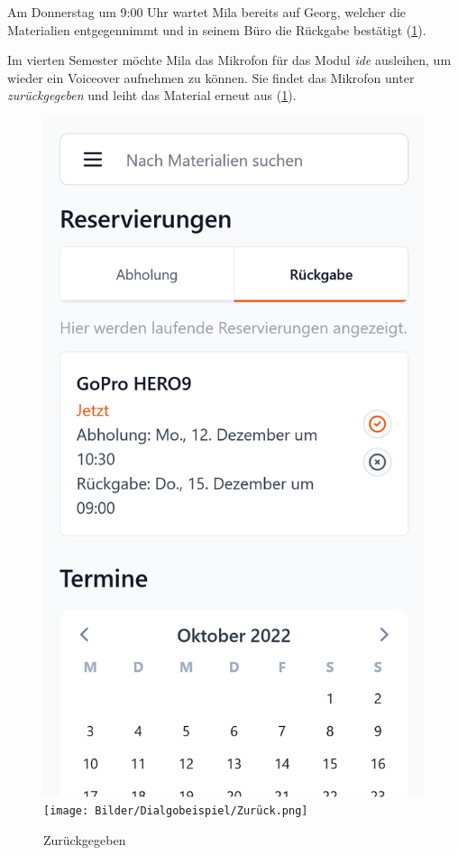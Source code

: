 Am Donnerstag um 9:00 Uhr wartet Mila bereits auf Georg, welcher die
Materialien entgegennimmt und in seinem Büro die Rückgabe bestätigt (\ref{fig:zuruck}).

Im vierten Semester möchte Mila das Mikrofon für das Modul \textit{\ac{ide}}
ausleihen, um wieder ein Voiceover aufnehmen zu können. Sie findet das Mikrofon
unter \textit{zurückgegeben} und leiht das Material erneut aus (\ref{fig:zuruck}).
\begin{figure}[h]
    \centering
    \includegraphics[scale=0.14]{Bilder/Dialgobeispiel/Altes Datum.png}\hspace{1em}
    \texttt{[image: Bilder/Dialgobeispiel/Zurück.png]}\hspace{1em}
    \caption[Dialogbeispiel 5]{Zurückgegeben}\label{fig:zuruck}
\end{figure}